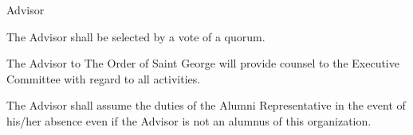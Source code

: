{
\begin{article}{Advisor}
	\item The Advisor shall be selected by a vote of a quorum.
	\item The Advisor to The Order of Saint George will provide counsel to the Executive Committee with regard to all activities.
	\item The Advisor shall assume the duties of the Alumni Representative in the event of his/her absence even if the Advisor is not an alumnus of this organization.
\end{article}
}